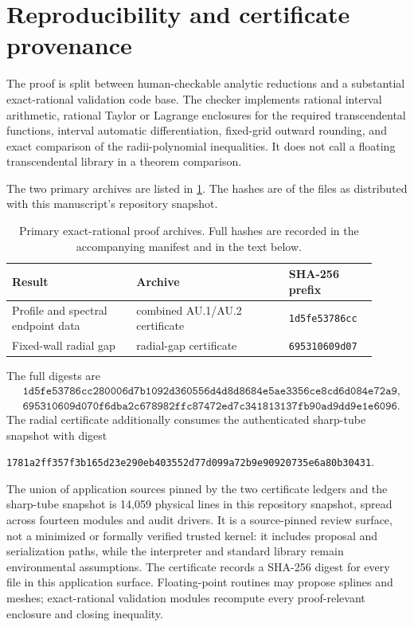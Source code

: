 \section{Reproducibility and certificate provenance}
\label{sec:reproducibility}

The proof is split between human-checkable analytic reductions and a
substantial exact-rational validation code base.  The checker implements
rational interval arithmetic,
rational Taylor or Lagrange enclosures for the required transcendental
functions, interval automatic differentiation, fixed-grid outward rounding,
and exact comparison of the radii-polynomial inequalities.  It does not call a
floating transcendental library in a theorem comparison.

The two primary archives are listed in \cref{tab:archives}.  The hashes are
of the files as distributed with this manuscript's repository snapshot.

\begin{table}[ht]
  \centering
  \small
  \begin{tabular}{@{}p{0.31\linewidth}p{0.38\linewidth}p{0.22\linewidth}@{}}
    \toprule
    Result & Archive & SHA-256 prefix \\
    \midrule
    Profile and spectral endpoint data & combined AU.1/AU.2 certificate & \texttt{1d5fe53786cc} \\
    Fixed-wall radial gap & radial-gap certificate & \texttt{695310609d07} \\
    \bottomrule
  \end{tabular}
  \caption{Primary exact-rational proof archives.  Full hashes are recorded in
  the accompanying manifest and in the text below.}
  \label{tab:archives}
\end{table}

The full digests are
\begin{align*}
 &\texttt{1d5fe53786cc280006d7b1092d360556d4d8d8684e5ae3356ce8cd6d084e72a9},\\
 &\texttt{695310609d070f6dba2c678982ffc87472ed7c341813137fb90ad9dd9e1e6096}.
\end{align*}
The radial certificate additionally consumes the authenticated sharp-tube
snapshot with digest
\begin{center}
\texttt{1781a2ff357f3b165d23e290eb403552d77d099a72b9e90920735e6a80b30431}.
\end{center}

The union of application sources pinned by the two certificate ledgers and the
sharp-tube snapshot is 14,059 physical lines in this repository snapshot,
spread across fourteen modules and audit drivers.  It is a source-pinned
review surface, not a minimized or formally verified trusted kernel: it
includes proposal and serialization paths, while the interpreter and standard
library remain environmental assumptions.  The certificate records a SHA-256
digest for every file in this application surface.  Floating-point routines
may propose splines and meshes; exact-rational validation modules recompute
every proof-relevant enclosure and closing inequality.

